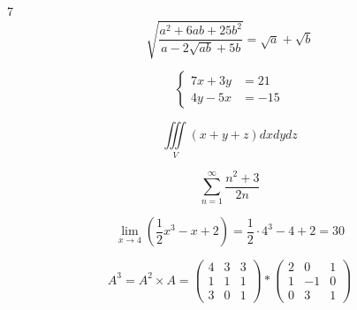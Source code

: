 \documentclass[12pt, fleqn]{article}
\begin{document}
	7
	\begin{equation} %
		\label{eq1} 
			\sqrt{\frac{a^2 + 6ab + 25b^2}{a - 2\sqrt{ab} + 5b}} = \sqrt{a} + \sqrt{b}
	\end{equation}
	
	\begin{equation} %
		\label{eq6} 
        \left \{
		\begin{aligned}
			7x + 3y &= 21 \\
			4y - 5x &= -15
		\end{aligned}
		\right .
	\end{equation}
	
	\begin{equation} %
		\label{eq7}  
			\iiint\limits_V \left( x+y+z \right) {dxdydz} 
	\end{equation}
	
	\begin{equation} %
		\label{eq9}  
			\sum_{n=1}^{\infty} \frac{n^2 + 3}{2n}
	\end{equation}
	
	\begin{equation} %
		\label{eq10}  
			\lim_{x \to 4} \left( \frac{1}{2} x^3 - x + 2 \right) = \frac{1}{2} \cdot 4^3 - 4 + 2 = 30
	\end{equation}
	
	\begin{equation} %
		\label{eq11}  
			A^3 = A^2 \times A =
			\left(
			\begin{array}{ccc} 
				4&3&3\\ 
				1&1&1\\ 
				3&0&1 
			\end{array}
			\right)
			*
			\left(
			\begin{array}{ccc} 
				2&0&1\\ 
				1&-1&0\\ 
				0&3&1 
			\end{array}
			\right)
	\end{equation}
\end{document}
